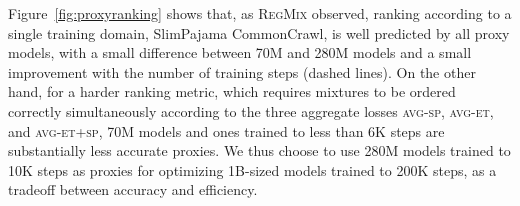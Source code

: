 Figure~\ref{fig:proxyranking} shows that, as \textsc{RegMix} observed, ranking according to a single training domain, SlimPajama {\small{CommonCrawl}}, is well predicted by all proxy models, with a small difference between 70M and 280M models and a small improvement with the number of training steps (dashed lines). On the other hand, for a harder ranking metric, which requires mixtures to be ordered correctly simultaneously according to the three aggregate losses \textsc{avg-sp}, \textsc{avg-et}, and \textsc{avg-et+sp}, 70M  models and ones trained to less than 6K steps are substantially less accurate proxies. We thus choose to use 280M models trained to 10K steps as proxies for optimizing 1B-sized models trained to 200K steps, as a tradeoff between accuracy and efficiency.



